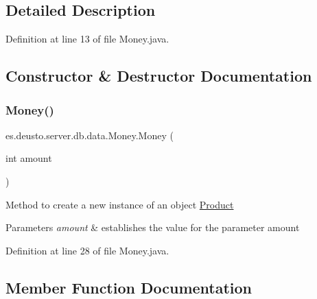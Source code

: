 \subsection{Detailed Description}


Definition at line 13 of file Money.\+java.



\subsection{Constructor \& Destructor Documentation}
\mbox{\label{classes_1_1deusto_1_1server_1_1db_1_1data_1_1_money_a25df7b8a67c257434bf09b7d8e7e2dbd}} 
\subsubsection{\texorpdfstring{Money()}{Money()}}
{\footnotesize\ttfamily es.\+deusto.\+server.\+db.\+data.\+Money.\+Money (\begin{DoxyParamCaption}\item[{int}]{amount }\end{DoxyParamCaption})}

Method to create a new instance of an object \hyperlink{classes_1_1deusto_1_1server_1_1db_1_1data_1_1_product}{Product} 
\begin{DoxyParams}{Parameters}
{\em amount} & establishes the value for the parameter amount \\
\hline
\end{DoxyParams}


Definition at line 28 of file Money.\+java.



\subsection{Member Function Documentation}
\mbox{\label{classes_1_1deusto_1_1server_1_1db_1_1data_1_1_money_a6f9db9361544c72ecaa89ec27309645d}} 
